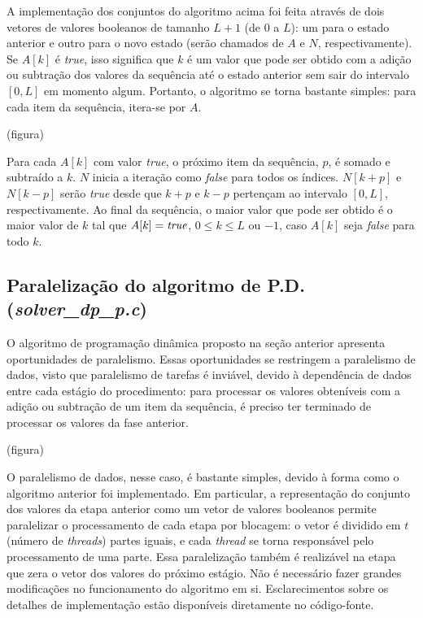\documentclass[10pt,a4paper]{article}
\numberwithin{equation}{section}
\begin{document}
A implementação dos conjuntos do algoritmo acima foi feita através de dois vetores de valores booleanos de tamanho $L + 1$ (de $0$ a $L$): um para o estado anterior e outro para o novo estado (serão chamados de $A$ e $N$, respectivamente). Se $A[k]$ é \emph{true}, isso significa que $k$ é um valor que pode ser obtido com a adição ou subtração dos valores da sequência até o estado anterior sem sair do intervalo $[0,L]$ em momento algum. Portanto, o algoritmo se torna bastante simples: para cada item da sequência, itera-se por $A$.

(figura)

Para cada $A[k]$ com valor \emph{true}, o próximo item da sequência, $p$, é somado e subtraído a $k$. $N$ inicia a iteração como \emph{false} para todos os índices. $N[k+p]$ e $N[k-p]$ serão \emph{true} desde que $k+p$ e $k-p$ pertençam ao intervalo $[0,L]$, respectivamente. Ao final da sequência, o maior valor que pode ser obtido é o maior valor de $k$ tal que $A[k]=\text{\emph{true}}$, $0 \le k \le L$ ou $-1$, caso $A[k]$ seja \emph{false} para todo $k$.

\subsection{Paralelização do algoritmo de P.D. (\emph{solver\_dp\_p.c})}

O algoritmo de programação dinâmica proposto na seção anterior apresenta oportunidades de paralelismo. Essas oportunidades se restringem a paralelismo de dados, visto que paralelismo de tarefas é inviável, devido à dependência de dados entre cada estágio do procedimento: para processar os valores obteníveis com a adição ou subtração de um item da sequência, é preciso ter terminado de processar os valores da fase anterior.

(figura)

O paralelismo de dados, nesse caso, é bastante simples, devido à forma como o algoritmo anterior foi implementado. Em particular, a representação do conjunto dos valores da etapa anterior como um vetor de valores booleanos permite paralelizar o processamento de cada etapa por blocagem: o vetor é dividido em $t$ (número de \emph{threads}) partes iguais, e cada \emph{thread} se torna responsável pelo processamento de uma parte. Essa paralelização também é realizável na etapa que zera o vetor dos valores do próximo estágio. Não é necessário fazer grandes modificações no funcionamento do algoritmo em si. Esclarecimentos sobre os detalhes de implementação estão disponíveis diretamente no código-fonte.
\end{document}
